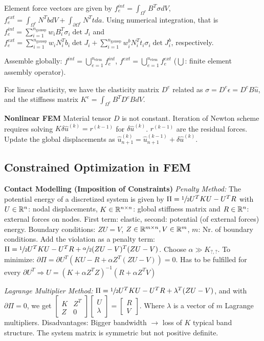Element force vectors are given by
$f_e^{int} = \int_{\Omega^e} B^T \sigma dV$, $f_e^{ext} = \int_{\Omega^e} N^T b  dV + \int_{\partial\Omega^e} N^T t  da$.
Using numerical integration, that is $f_e^{int} = \sum_{i=1}^{n_{\text{gaussp}}} w_i B_i ^T \sigma_i \det{J_i}$ and $f_e^{ext} = \sum_{i=1}^{n_{\text{gaussp}}} w_i N_i ^T b_i \det{J_i} + \sum_{i=1}^{n_{\text{gaussp}}} w_i^b N_i ^T t_i \sigma_i \det{J_i^b}$, respectively.

Assemble globally: $f^{int} = \bigcup_{e=1}^{n_{\text{elem}}} f_e^{int}$,  $f^{ext} = \bigcup_{e=1}^{n_{\text{elem}}} f_e^{ext}$ ($\bigcup$: finite element assembly operator).

For linear elasticity, we have the elasticity matrix $D^e$ related as $\sigma= D^e \epsilon = D^e B \hat{u}$, and the stiffness matrix $K ^e = \int_{\Omega^e} B^T D^e B dV$.

\textbf{Nonlinear FEM}
Material tensor $D$ is not constant. Iteration of Newton scheme requires solving $K \delta \hat{u}^{(k)} = r^{(k-1)}$ for $\delta \hat{u}^{(k)}$.
$r^{(k-1)}$ are the residual forces.
Update the global displacements as $\hat{u}_{n+1}^{(k)} = \hat{u}_{n+1}^{(k-1)} + \delta \hat{u}^{(k)}$.

\subsection*{Constrained Optimization in FEM}
\textbf{Contact Modelling (Imposition of Constraints)}
\textit{Penalty Method:}
The potential energy of a discretized system is given by $\Pi = \sfrac{1}{2} U^T K U - U^T R$ with $U\in\mathbb{R}^n$: nodal displacements, $K\in\mathbb{R}^{n\times n}$: global stiffness matrix and $R\in\mathbb{R}^n$: external forces on nodes.
First term: elastic, second: potential (of external forces) energy.
Boundary conditions: $ZU=V$, $Z\in\mathbb{R}^{m \times n}, V\in \mathbb{R}^m$, $m$: Nr. of boundary conditions. 
Add the violation as a penalty term:
$\Pi = \sfrac{1}{2} U^T K U - U^T R + \sfrac{\alpha}{2}(ZU-V)^T(ZU-V)$.
Choose $\alpha \gg K_{?,?}$.
To minimize: $\partial\Pi = \partial U^T (KU -R+\alpha Z^T (ZU-V))=0$.
Has to be fulfilled for every $\partial U^T \Rightarrow U = (K+\alpha Z^T Z)^{-1} (R+\alpha Z^T V)$

\textit{Lagrange Multiplier Method:}
$\Pi = \sfrac{1}{2} U^T K U - U^T R + \lambda^T (ZU-V)$, and with $\partial \Pi = 0$, we get $\begin{bmatrix}
K & Z^T \\
Z & 0
\end{bmatrix} \begin{bmatrix}
U \\
\lambda
\end{bmatrix} = \begin{bmatrix}
R \\
V
\end{bmatrix}$.
Where $\lambda$ is a vector of $m$ Lagrange multipliers.
Disadvantages: Bigger bandwidth $\rightarrow$ loss of $K$ typical band structure. The system matrix is symmetric but not positive definite.